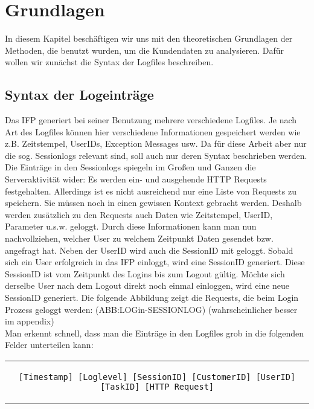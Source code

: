\section{Grundlagen}\raggedbottom
\label{sec:Grundlagen}
In diesem Kapitel beschäftigen wir uns mit den theoretischen Grundlagen der Methoden, die benutzt wurden, um die Kundendaten zu analysieren. Dafür wollen wir zunächst die Syntax der Logfiles beschreiben.

\subsection{Syntax der Logeinträge}
\label{sub:Aufbau der Logeinträge}
Das IFP generiert bei seiner Benutzung mehrere verschiedene Logfiles. Je nach Art des Logfiles können hier verschiedene Informationen gespeichert werden wie z.B. Zeitstempel, UserIDs, Exception Messages usw. Da für diese Arbeit aber nur die sog. \glqq Sessionlogs\grqq{} relevant sind, soll auch nur deren Syntax beschrieben werden.\\
Die Einträge in den Sessionlogs spiegeln im Großen und Ganzen die Serveraktivität wider: Es werden ein- und ausgehende HTTP Requests festgehalten. Allerdings ist es nicht ausreichend nur eine Liste von Requests zu speichern. Sie müssen noch in einen gewissen Kontext gebracht werden. Deshalb werden zusätzlich zu den Requests auch Daten wie Zeitstempel, UserID, Parameter u.s.w. geloggt. Durch diese Informationen kann man nun nachvollziehen, welcher User zu welchem Zeitpunkt Daten gesendet bzw. angefragt hat. Neben der UserID wird auch die SessionID mit geloggt. Sobald sich ein User erfolgreich in das IFP einloggt, wird eine SessionID generiert. Diese SessionID ist vom Zeitpunkt des Logins bis zum Logout gültig. Möchte sich derselbe User nach dem Logout direkt noch einmal einloggen, wird eine neue SessionID generiert. Die folgende Abbildung zeigt die Requests, die beim Login Prozess geloggt werden: (ABB:LOGin-SESSIONLOG) (wahrscheinlicher besser im appendix)
\\
Man erkennt schnell, dass man die Einträge in den Logfiles grob in die folgenden Felder unterteilen kann:\\

\begin{center}
	\begin{tabular}{c}
		\begin{lstlisting}[numbers=none, basicstyle=\scriptsize,caption=Felder in Sessionlogs,captionpos=b,label=lst:tab_session_fields]
[Timestamp] [Loglevel] [SessionID] [CustomerID] [UserID] [TaskID] [HTTP Request]
		\end{lstlisting}
	\end{tabular}
\end{center}

